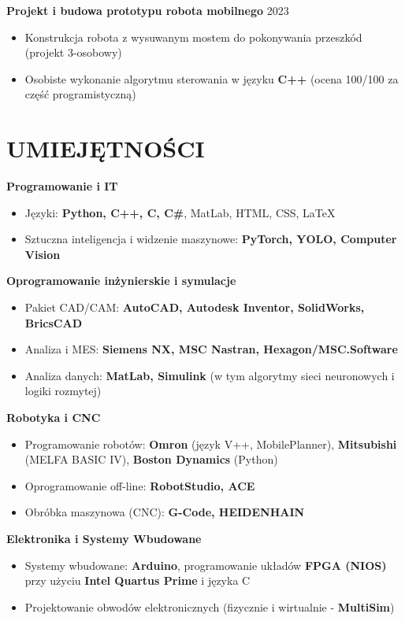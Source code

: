 \documentclass[a4paper,10pt]{extarticle}
\begin{document}
\vspace{0.15cm}
\noindent
\textbf{{Projekt i budowa prototypu robota mobilnego}} \hfill 2023
\begin{itemize}
    \item Konstrukcja robota z wysuwanym mostem do pokonywania przeszkód (projekt 3-osobowy)
    \item Osobiste wykonanie algorytmu sterowania w języku \textbf{C++} (ocena 100/100 za część programistyczną)
\end{itemize}

\section*{UMIEJĘTNOŚCI}

\noindent
\textbf{{Programowanie i IT}} \hfill
\begin{itemize}
    \item Języki: \textbf{Python, C++, C, C\#}, MatLab, HTML, CSS, LaTeX
    \item Sztuczna inteligencja i widzenie maszynowe: \textbf{PyTorch, YOLO, Computer Vision}
\end{itemize}

\noindent
\textbf{{Oprogramowanie inżynierskie i symulacje}} \hfill
\begin{itemize}
    \item Pakiet CAD/CAM: \textbf{AutoCAD, Autodesk Inventor, SolidWorks, BricsCAD}
    \item Analiza i MES: \textbf{Siemens NX, MSC Nastran, Hexagon/MSC.Software}
    \item Analiza danych: \textbf{MatLab, Simulink} (w tym algorytmy sieci neuronowych i logiki rozmytej)
\end{itemize}

\noindent
\textbf{{Robotyka i CNC}} \hfill
\begin{itemize}
    \item Programowanie robotów: \textbf{Omron} (język V++, MobilePlanner), \textbf{Mitsubishi} (MELFA BASIC IV), \textbf{Boston Dynamics} (Python)
    \item Oprogramowanie off-line: \textbf{RobotStudio, ACE}
    \item Obróbka maszynowa (CNC): \textbf{G-Code, HEIDENHAIN}
\end{itemize}

\noindent
\textbf{{Elektronika i Systemy Wbudowane}} \hfill 
\begin{itemize}
    \item Systemy wbudowane: \textbf{Arduino}, programowanie układów \textbf{FPGA (NIOS)} przy użyciu \textbf{Intel Quartus Prime} i języka C
    \item Projektowanie obwodów elektronicznych (fizycznie i wirtualnie - \textbf{MultiSim})
\end{itemize}
\end{document}

